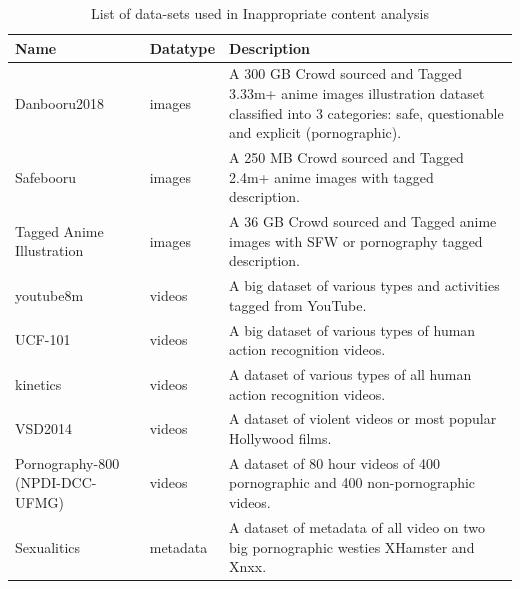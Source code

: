\documentclass[runningheads]{llncs}
\begin{document}
\begin{table}
\caption{List of data-sets used in Inappropriate content analysis}
\label{tab_dataset}
\begin{tabular}{|p{3cm}|p{1.5cm}|p{7.5cm}|}
\hline
Name & Datatype & Description \\
\hline
\hspace{0pt}Danbooru2018 \cite{Danbooru2018} & images & A 300 GB Crowd sourced and Tagged 3.33m+ anime images illustration dataset classified into 3 categories: safe, questionable and explicit (pornographic). \\
\hline
Safebooru \cite{Safebooru} & images & A 250 MB Crowd sourced and Tagged 2.4m+ anime images with tagged description. \\
\hline
Tagged Anime Illustration \cite{TaggedAnimeIllustration} & images & A 36 GB Crowd sourced and Tagged anime images with SFW or pornography tagged description. \\
\hline
youtube8m \cite{youtube8m} & videos & A big dataset of various types and activities tagged from YouTube. \\
\hline
UCF-101 \cite{UCF-101} & videos & A big dataset of various types of human action recognition videos.\\
\hline
kinetics \cite{kinetics} & videos & A dataset of various types of all human action recognition videos. \\
\hline
VSD2014 \cite{VSD2014} & videos & A dataset of violent videos or most popular Hollywood films. \\
\hline
Pornography-800 (NPDI-DCC-UFMG) \cite{Pornography-800} & videos & A dataset of 80 hour videos of 400 pornographic and 400 non-pornographic videos. \\
\hline
Sexualitics \cite{Sexualitics}& metadata & A dataset of metadata of all video on two big pornographic westies XHamster and Xnxx. \\
\hline

\end{tabular}
\end{table}
\end{document}
